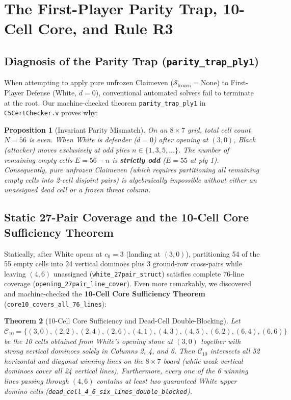 \documentclass[11pt,reqno]{amsart}
\theoremstyle{plain}
\newtheorem{theorem}{Theorem}[section]
\newtheorem{proposition}[theorem]{Proposition}
\theoremstyle{definition}
\theoremstyle{remark}
\begin{document}
\section{The First-Player Parity Trap, 10-Cell Core, and Rule R3}

\subsection{Diagnosis of the Parity Trap (\texttt{parity\_trap\_ply1})}
When attempting to apply pure unfrozen Claimeven ($\mathcal{S}_{\text{frozen}} = \text{None}$) to First-Player Defense (White, $d = 0$), conventional automated solvers fail to terminate at the root. Our machine-checked theorem \texttt{parity\_trap\_ply1} in \texttt{C5CertChecker.v} proves why:

\begin{proposition}[Invariant Parity Mismatch]
On an $8 \times 7$ grid, total cell count $N = 56$ is even. When White is defender ($d = 0$) after opening at $(3,0)$, Black (attacker) moves exclusively at odd plies $n \in \{1, 3, 5, \dots\}$. The number of remaining empty cells $E = 56 - n$ is \textbf{strictly odd} ($E = 55$ at ply 1). Consequently, pure unfrozen Claimeven (which requires partitioning all remaining empty cells into 2-cell disjoint pairs) is algebraically impossible without either an unassigned dead cell or a frozen threat column.
\end{proposition}

\subsection{Static 27-Pair Coverage and the 10-Cell Core Sufficiency Theorem}
Statically, after White opens at $c_0 = 3$ (landing at $(3, 0)$), partitioning 54 of the 55 empty cells into 24 vertical dominoes plus 3 ground-row cross-pairs while leaving $(4, 6)$ unassigned (\texttt{white\_27pair\_struct}) satisfies complete 76-line coverage (\texttt{opening\_27pair\_line\_cover}). Even more remarkably, we discovered and machine-checked the \textbf{10-Cell Core Sufficiency Theorem} (\texttt{core10\_covers\_all\_76\_lines}):
\begin{theorem}[10-Cell Core Sufficiency and Dead-Cell Double-Blocking]
\label{thm:line_coverage}
Let $\mathcal{C}_{10} = \{(3,0), (2,2), (2,4), (2,6), (4,1), (4,3), (4,5), (6,2), (6,4), (6,6)\}$ be the 10 cells obtained from White's opening stone at $(3,0)$ together with strong vertical dominoes solely in Columns 2, 4, and 6. Then $\mathcal{C}_{10}$ intersects all 52 horizontal and diagonal winning lines on the $8 \times 7$ board (while weak vertical dominoes cover all 24 vertical lines). Furthermore, every one of the 6 winning lines passing through $(4, 6)$ contains at least two guaranteed White upper domino cells (\texttt{dead\_cell\_4\_6\_six\_lines\_double\_blocked}).
\end{theorem}
\end{document}
